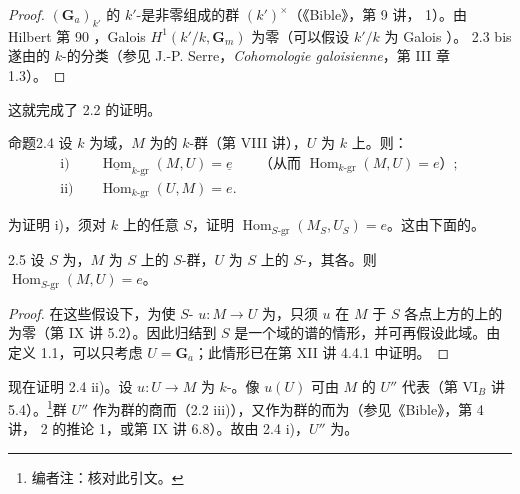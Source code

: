 \begin{proof}
 $(\mathbf G_a)_{k'}$ 的 $k'$-是非零组成的群 $(k')^\times$（《Bible》，第 9 讲， 1）。由 Hilbert 第 90 ，Galois  $H^1(k'/k,\mathbf G_m)$ 为零（可以假设 $k'/k$ 为 Galois ）。 2.3 bis 遂由的 $k$-的分类（参见 J.-P. Serre，\textit{Cohomologie galoisienne}，第 III 章 1.3）。
\end{proof}
这就完成了 2.2 的证明。
\begin{SGAresult}{命题}{2.4}
设 $k$ 为域，$M$ 为的 $k$-群（第 VIII 讲），$U$ 为 $k$ 上。则：
\[
\begin{aligned}
\text{i)}\quad&\underline{\operatorname{Hom}}_{k\text{-gr}}(M,U)=\underline e
&&\text{（从而 }\operatorname{Hom}_{k\text{-gr}}(M,U)=e\text{）};\\
\text{ii)}\quad&\operatorname{Hom}_{k\text{-gr}}(U,M)=e.
\end{aligned}
\]
\end{SGAresult}
为证明 i)，须对 $k$ 上的任意 $S$，证明 $\operatorname{Hom}_{S\text{-gr}}(M_S,U_S)=e$。这由下面的。
\begin{SGAresult}{}{2.5}
设 $S$ 为，$M$ 为 $S$ 上的 $S$-群，$U$ 为 $S$ 上的 $S$-，其各。则 $\operatorname{Hom}_{S\text{-gr}}(M,U)=e$。
\end{SGAresult}
\begin{proof}
在这些假设下，为使 $S$- $u:M\to U$ 为，只须 $u$ 在 $M$ 于 $S$ 各点上方的上的为零（第 IX 讲 5.2）。因此归结到 $S$ 是一个域的谱的情形，并可再假设此域。由定义 1.1，可以只考虑 $U=\mathbf G_a$；此情形已在第 XII 讲 4.4.1 中证明。
\end{proof}
现在证明 2.4 ii)。设 $u:U\to M$ 为 $k$-。像 $u(U)$ 可由 $M$ 的 $U''$ 代表（第 VI$_B$ 讲 5.4）。\footnote{编者注：核对此引文。}群 $U''$ 作为群的商而（2.2 iii)），又作为群的而为（参见《Bible》，第 4 讲， 2 的推论 1，或第 IX 讲 6.8）。故由 2.4 i)，$U''$ 为。
